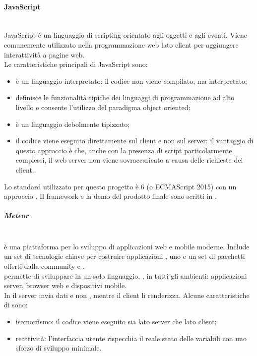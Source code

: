 \paragraph{JavaScript}\mbox{}\\
JavaScript è un linguaggio di scripting orientato agli oggetti e agli eventi. Viene comunemente utilizzato nella programmazione web lato client per aggiungere interattività a pagine web.\\
Le caratteristiche principali di JavaScript sono:
\begin{itemize}
	\item è un linguaggio interpretato: il codice non viene compilato, ma interpretato;
	\item definisce le funzionalità tipiche dei linguaggi di programmazione ad alto livello e consente l'utilizzo del paradigma object oriented;
	\item è un linguaggio debolmente tipizzato;
	\item il codice viene eseguito direttamente sul client e non sul server: il vantaggio di questo approccio è che, anche con la presenza di script particolarmente complessi, il web server non viene sovraccaricato a causa delle richieste dei client.
\end{itemize}
Lo standard utilizzato per questo progetto è  6 (o {ECMAScript} 2015) con un approccio .
Il framework e la demo del prodotto finale sono scritti in .

\subparagraph{Meteor}\mbox{}\\
 è una piattaforma   per lo sviluppo di applicazioni web e mobile moderne. Include un set di tecnologie chiave per costruire applicazioni , uno  e un set di pacchetti offerti dalla community  e .\\
 permette di sviluppare in un solo linguaggio, , in tutti gli ambienti: applicazioni server, browser web e dispositivi mobile.\\
In  il server invia dati e non , mentre il client li renderizza.
Alcune caratteristiche di  sono:
\begin{itemize}
	\item isomorfismo: il codice viene eseguito sia lato server che lato client;
	\item reattività: l'interfaccia utente rispecchia il reale stato delle variabili con uno sforzo di sviluppo minimale.
\end{itemize}

